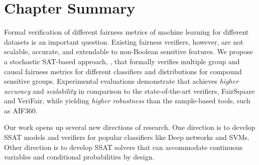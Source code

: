 \section{Chapter Summary}
Formal verification of different fairness metrics of machine learning for different datasets is an important question. Existing fairness verifiers, however, are not scalable, accurate, and extendable to non-Boolean sensitive features. We propose a stochastic SAT-based approach, {\justicia}, that formally verifies multiple group and causal fairness metrics for different classifiers and distributions for compound sensitive groups.
Experimental evaluations demonstrate that {\justicia} achieves \textit{higher accuracy} and \textit{scalability} in comparison to the state-of-the-art verifiers, FairSquare and VeriFair, while yielding \textit{higher robustness} than the sample-based tools, such as AIF360.

Our work opens up several new directions of research. One direction is to develop SSAT models and verifiers for popular classifiers like Deep networks and SVMs. Other direction is to develop SSAT solvers that can accommodate continuous variables and conditional probabilities by design.

